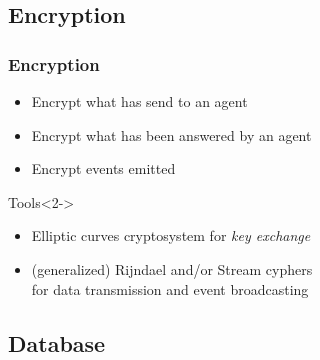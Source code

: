 \documentclass{beamer}
\begin{document}
\subsection{Encryption}

\begin{frame}
\frametitle{Encryption}
    \begin{itemize}
        \item Encrypt what has send to an agent
        \item Encrypt what has been answered by an agent
        \item Encrypt events emitted
    \end{itemize}
    \begin{alertblock}{Tools}<2->
        \begin{itemize}
            \item Elliptic curves cryptosystem for \emph{key exchange}
            \item (generalized) Rijndael and/or Stream cyphers\\for data transmission and event broadcasting
        \end{itemize}
    \end{alertblock}
\end{frame}

\subsection{Database}
\end{document}
